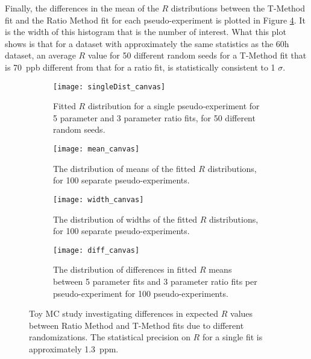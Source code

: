 
Finally, the differences in the mean of the $R$ distributions between the T-Method fit and the Ratio Method fit for each pseudo-experiment is plotted in Figure \ref{Subfig:DiffDist}. It is the width of this histogram that is the number of interest. What this plot shows is that for a dataset with approximately the same statistics as the 60h dataset, an average $R$ value for 50 different random seeds for a T-Method fit that is \SI{70}{ppb} different from that for a ratio fit, is statistically consistent to 1 $\sigma$. 


	\begin{figure}[h]
	\centering
	    \begin{subfigure}[t]{0.45\textwidth}
		    \centering
			\texttt{[image: singleDist\_canvas]}
		    \caption{Fitted $R$ distribution for a single pseudo-experiment for 5 parameter and 3 parameter ratio fits, for 50 different random seeds.}
		\label{Subfig:SingleRDist}
	    \end{subfigure}
	   	\hspace{4mm}
	    \begin{subfigure}[t]{0.45\textwidth}
		    \centering
			\texttt{[image: mean\_canvas]}
		    \caption{The distribution of means of the fitted $R$ distributions, for 100 separate pseudo-experiments.}
		\label{Subfig:MeanDist}
	    \end{subfigure}%
	    \vspace{4mm}
	    \begin{subfigure}[t]{0.45\textwidth}
		    \centering
			\texttt{[image: width\_canvas]}
		    \caption{The distribution of widths of the fitted $R$ distributions, for 100 separate pseudo-experiments.}
		\label{Subfig:WidthDist}
	    \end{subfigure}
	   	\hspace{4mm}
	    \begin{subfigure}[t]{0.45\textwidth}
		    \centering
			\texttt{[image: diff\_canvas]}
		    \caption{The distribution of differences in fitted $R$ means between 5 parameter fits and 3 parameter ratio fits per pseudo-experiment for 100 pseudo-experiments.}
		\label{Subfig:DiffDist}
	    \end{subfigure}%
	\caption[Ratio Method fitted $R$ values compared with T-Method $R$ values in Toy MC with different randomizations]{Toy MC study investigating differences in expected $R$ values between Ratio Method and T-Method fits due to different randomizations. The statistical precision on $R$ for a single fit is approximately \SI{1.3}{ppm}.}
	\label{fig:TMethodComparison}
	\end{figure}
